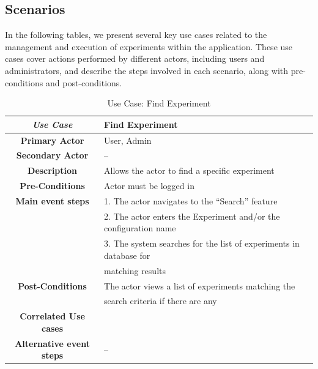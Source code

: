 \subsection{Scenarios}
In the following tables, we present several key use cases related to the management and execution of experiments within the application. These use cases cover actions performed by different actors, including users and administrators, and describe the steps involved in each scenario, along with pre-conditions and post-conditions.
\begin{table}[ht!]
    \centering
    \caption{Use Case: Find Experiment}
    \begin{tabularx}{\textwidth}{|Sl|S{X}|}
        \hline
        \textbf{\textit{Use Case}}       & \textbf{Find Experiment}                                           \\ \hline
        \textbf{Primary Actor}           & User, Admin                                                        \\ \hline
        \textbf{Secondary Actor}         & --                                                                 \\ \hline
        \textbf{Description}             & Allows the actor to find a specific experiment                     \\ \hline
        \textbf{Pre-Conditions}          & Actor must be logged in                                            \\ \hline
        \textbf{Main event steps}        & 1. The actor navigates to the “Search” feature                     \\
                                         & 2. The actor enters the Experiment and/or the configuration name   \\
                                         & 3. The system searches for the list of experiments in database for \\
                                         & matching results                                                   \\ \hline
        \textbf{Post-Conditions}         & The actor views a list of experiments matching the                 \\
                                         & search criteria if there are any                                   \\ \hline
        \textbf{Correlated Use cases}    &                                                                    \\ \hline
        \textbf{Alternative event steps} & --                                                                 \\ \hline
    \end{tabularx}
\end{table}

